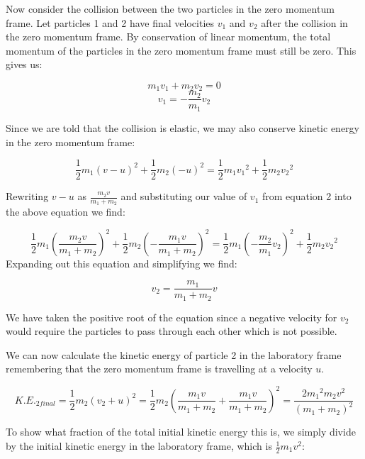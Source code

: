 \begin{problem}
{Now consider the collision between the two particles in the zero momentum frame. Let particles 1 and 2 have final velocities $v_1$ and $v_2$ after the collision in the zero momentum frame. By conservation of linear momentum, the total momentum of the particles in the zero momentum frame must still be zero. This gives us:

\begin{equation*}m_1 v_1 + m_2 v_2=0\end{equation*}
\begin{equation}v_1=-\frac{m_2}{m_1}v_2\end{equation}

Since we are told that the collision is elastic, we may also conserve kinetic energy in the zero momentum frame:

\begin{equation*}\frac{1}{2}m_1 (v-u)^2+\frac{1}{2}m_2(-u)^2=\frac{1}{2}m_1{v_1}^2+\frac{1}{2}m_2{v_2}^2\end{equation*}

Rewriting $v-u$ as $\frac{m_2 v}{m_1 + m_2}$ and substituting our value of $v_1$ from equation 2 into the above equation we find:

\begin{equation*}\frac{1}{2}m_1 \left(\frac{m_2 v}{m_1 + m_2}\right)^2+\frac{1}{2}m_2\left(-\frac{m_1 v}{m_1 + m_2}\right)^2=\frac{1}{2}m_1\left({-\frac{m_2}{m_1}v_2}\right)^2+\frac{1}{2}m_2{v_2}^2\end{equation*}
Expanding out this equation and simplifying we find:

\begin{equation*}v_2=\frac{m_1}{m_1 + m_2}v\end{equation*}

We have taken the positive root of the equation since a negative velocity for $v_2$ would require the particles to pass through each other which is not possible. 

We can now calculate the kinetic energy of particle 2 in the laboratory frame remembering that the zero momentum frame is travelling at a velocity $u$.

\begin{equation*}K.E._{2final}=\frac{1}{2}m_2\left(v_2 + u\right)^2=\frac{1}{2}m_2\left(\frac{m_1v}{m_1 + m_2}+ \frac{m_1 v}{m_1 + m_2}\right)^2=\frac{2{m_1}^2m_2v^2}{\left(m_1 + m_2\right)^2}\end{equation*}

To show what fraction of the total initial kinetic energy this is, we simply divide by the initial kinetic energy in the laboratory frame, which is $\frac{1}{2}m_1v^2$:

}
\end{problem}
